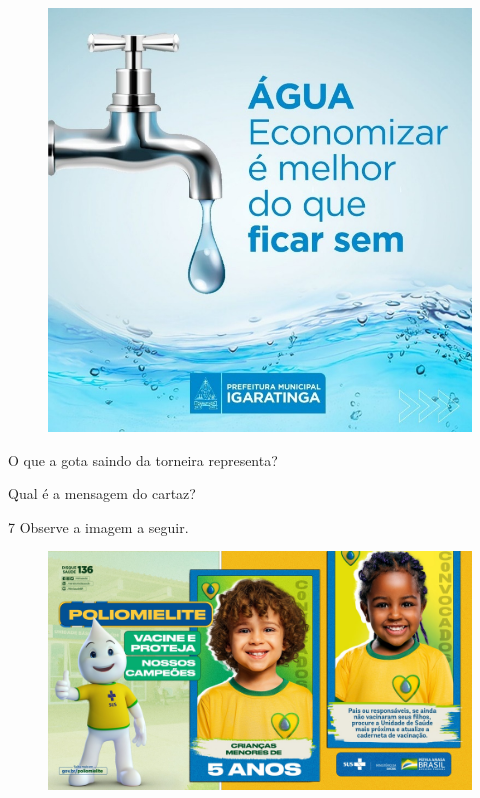 \begin{figure}[H]
\centering
\includegraphics[width=.8\textwidth]{media/image133.jpeg}
\end{figure}


\begin{escolha}
\item O que a gota saindo da torneira representa?


\item Qual é a mensagem do cartaz?

\end{escolha}

\num{7} Observe a imagem a seguir.

\begin{figure}[H]
\centering
\includegraphics[width=.8\textwidth]{media/image206.jpg}
\end{figure}

